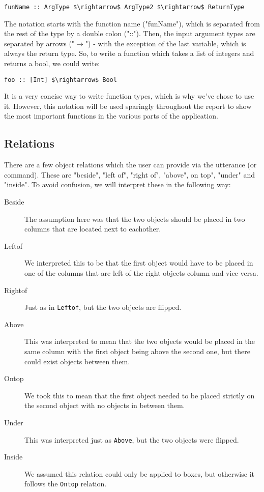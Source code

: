 \documentclass[11pt]{article}
\begin{document}
\begin{lstlisting}
funName :: ArgType $\rightarrow$ ArgType2 $\rightarrow$ ReturnType
\end{lstlisting}

The notation starts with the function name ("funName"), which is separated from the rest of the type by a double colon ("::").
Then, the input argument types are separated by arrows ("$\rightarrow$") - with the exception of the last variable, which is always the return type.
So, to write a function which takes a list of integers and returns a bool, we could write:

\begin{lstlisting}
foo :: [Int] $\rightarrow$ Bool
\end{lstlisting}

It is a very concise way to write function types, which is why we've chose to use it. However, this notation will be used sparingly throughout the report to show the most important functions in the various parts of the application.

\subsection*{Relations}
There are a few object relations which the user can provide via the utterance (or command). These are "beside", "left of", "right of", "above", on top", "under" and "inside". To avoid confusion, we will interpret these in the following way:

\begin{description}
  \item[Beside] The assumption here was that the two objects should be placed in
    two columns that are located next to eachother.
  \item[Leftof] We interpreted this to be that the first object would have to be
    placed in one of the columns that are left of the right objects column and
    vice versa.
  \item[Rightof] Just as in \verb|Leftof|, but the two objects are flipped.
  \item[Above] This was interpreted to mean that the two objects would be placed
    in the same column with the first object being above the second one, but
    there could exist objects between them.
  \item[Ontop] We took this to mean that the first object needed to be placed
   strictly on the second object with no objects in between them.
  \item[Under] This was interpreted just as \verb|Above|, but the two objects
    were flipped.
  \item[Inside] We assumed this relation could only be applied to boxes, but
  otherwise it follows the \verb|Ontop| relation.
\end{description}
\end{document}
